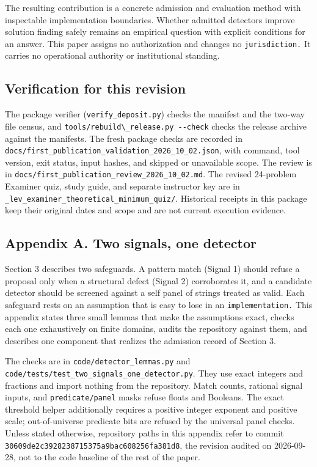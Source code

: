 \documentclass[
  11pt,
]{article}
\newcommand{\passthrough}[1]{#1}
\begin{document}
The resulting contribution is a concrete admission and evaluation method
with inspectable implementation boundaries. Whether admitted detectors
improve solution finding safely remains an empirical question with
explicit conditions for an answer. This paper assigns no authorization
and changes no \nolinkurl{jurisdiction.} It carries no operational
authority or institutional standing.

\subsection{Verification for this
revision}\label{verification-for-this-revision}

The package verifier (\nolinkurl{verify_deposit.py}) checks the manifest
and the two-way file census, and
\passthrough{\lstinline!tools/rebuild\_release.py --check!} checks the
release archive against the manifests. The fresh package checks are
recorded in
\nolinkurl{docs/first_publication_validation_2026_10_02.json}, with
command, tool version, exit status, input hashes, and skipped or
unavailable scope. The review is in
\nolinkurl{docs/first_publication_review_2026_10_02.md}. The revised
24-problem Examiner quiz, study guide, and separate instructor key are in
\nolinkurl{_lev_examiner_theoretical_minimum_quiz/}. Historical receipts
in this package keep their original dates and scope and are not current
execution evidence.

\subsection{Appendix A. Two signals, one
detector}\label{appendix-a.-two-signals-one-detector}

Section 3 describes two safeguards. A pattern match (Signal 1) should
refuse a proposal only when a structural defect (Signal 2) corroborates
it, and a candidate detector should be screened against a self panel of
strings treated as valid. Each safeguard rests on an assumption that is
easy to lose in an \nolinkurl{implementation.} This appendix states
three small lemmas that make the assumptions exact, checks each one
exhaustively on finite domains, audits the repository against them, and
describes one component that realizes the admission record of Section 3.

The checks are in \nolinkurl{code/detector_lemmas.py} and
\nolinkurl{code/tests/test_two_signals_one_detector.py}. They use exact
integers and fractions and import nothing from the repository. Match
counts, rational signal inputs, and \nolinkurl{predicate/panel} masks
refuse floats and Booleans. The exact threshold helper additionally
requires a positive integer exponent and positive scale; out-of-universe
predicate bits are refused by the universal panel checks. Unless stated
otherwise, repository paths in this appendix refer to commit
\nolinkurl{30609de2c3928238715375a9bac608256fa381d8}, the revision
audited on 2026-09-28, not to the code baseline of the rest of the
paper.
\end{document}
